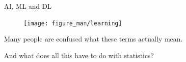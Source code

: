 \documentclass[11pt,compress,t,notes=noshow, xcolor=table]{beamer}
\begin{document}

\begin{frame}{AI, ML and DL}

\begin{center}

  \begin{figure}
    \texttt{[image: figure\_man/learning]} 
  \end{figure}
  \end{center}
  \lz

Many people are confused what these terms actually mean. 

\lz

And what does all this have to do with statistics?

  
\end{frame}

\end{document}
